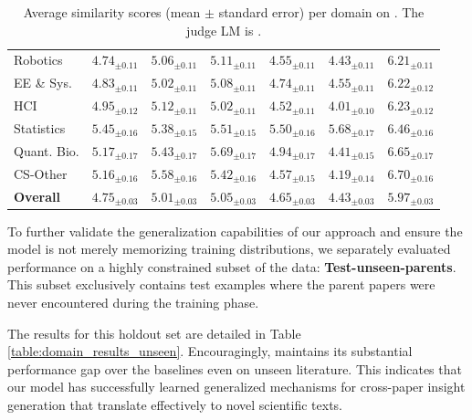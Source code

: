 \begin{table}[htbp]
{\begin{tabular}{lcccccc}
Robotics & $4.74_{{\pm0.11}}$ & $5.06_{{\pm0.11}}$ & $5.11_{{\pm0.11}}$ & $4.55_{{\pm0.11}}$ & $4.43_{{\pm0.11}}$ & \textbf{$6.21_{{\pm0.11}}$} \\
EE \& Sys. & $4.83_{{\pm0.11}}$ & $5.02_{{\pm0.11}}$ & $5.08_{{\pm0.11}}$ & $4.74_{{\pm0.11}}$ & $4.55_{{\pm0.11}}$ & \textbf{$6.22_{{\pm0.12}}$} \\
HCI & $4.95_{{\pm0.12}}$ & $5.12_{{\pm0.11}}$ & $5.02_{{\pm0.11}}$ & $4.52_{{\pm0.11}}$ & $4.01_{{\pm0.10}}$ & \textbf{$6.23_{{\pm0.12}}$} \\
Statistics & $5.45_{{\pm0.16}}$ & $5.38_{{\pm0.15}}$ & $5.51_{{\pm0.15}}$ & $5.50_{{\pm0.16}}$ & $5.68_{{\pm0.17}}$ & \textbf{$6.46_{{\pm0.16}}$} \\
Quant. Bio. & $5.17_{{\pm0.17}}$ & $5.43_{{\pm0.17}}$ & $5.69_{{\pm0.17}}$ & $4.94_{{\pm0.17}}$ & $4.41_{{\pm0.15}}$ & \textbf{$6.65_{{\pm0.17}}$} \\
CS-Other & $5.16_{{\pm0.16}}$ & $5.58_{{\pm0.16}}$ & $5.42_{{\pm0.16}}$ & $4.57_{{\pm0.15}}$ & $4.19_{{\pm0.14}}$ & \textbf{$6.70_{{\pm0.16}}$} \\
\midrule
\textbf{Overall} & $4.75_{{\pm0.03}}$ & $5.01_{{\pm0.03}}$ & $5.05_{{\pm0.03}}$ & $4.65_{{\pm0.03}}$ & $4.43_{{\pm0.03}}$ & \textbf{$5.97_{{\pm0.03}}$} \\
\bottomrule
\end{tabular}%
}
\caption{Average similarity scores (mean $\pm$ standard error) per domain on \ourbenchmark{}. The judge LM is \gemthreepro{}.}
\label{table:domain_results}
\end{table}

To further validate the generalization capabilities of our approach and ensure the model is not merely memorizing training distributions, we separately evaluated performance on a highly constrained subset of the data: \textbf{Test-unseen-parents}. This subset exclusively contains test examples where the parent papers were never encountered during the training phase. 

The results for this holdout set are detailed in Table \ref{table:domain_results_unseen}. Encouragingly, \ourmethod{} maintains its substantial performance gap over the baselines even on unseen literature. This indicates that our model has successfully learned generalized mechanisms for cross-paper insight generation that translate effectively to novel scientific texts.

